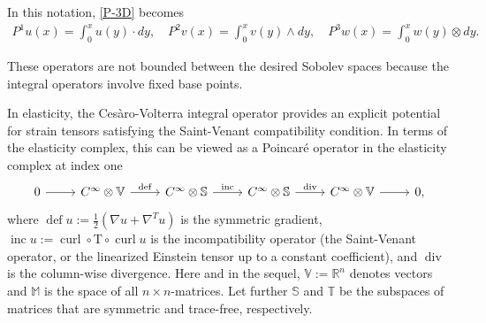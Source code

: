 \documentclass[11pt]{amsart}
\newcommand{\0}{\mathaccent23}
\newcommand\inc{\operatorname{inc}}
\newcommand\deff{\operatorname{def}}
\renewcommand\div{\operatorname{div}}
\newcommand\curl{\operatorname{curl}}
\begin{document}
In this notation, \eqref{P-3D} becomes
\begin{align}\label{P-3D-new-notation}
P^{1}u(x)=\int_{0}^{x}u(y)\cdot dy, \quad P^{2}v(x)=\int_{0}^{x}v(y)\wedge dy, \quad P^{3}w(x)=\int_{0}^{x}w(y)\otimes dy.
\end{align}



 These operators are not bounded between the desired Sobolev spaces because the integral operators involve fixed base points.  

In elasticity, the Ces\`aro-Volterra integral operator provides an explicit potential for strain tensors satisfying the Saint-Venant compatibility condition. In terms of the elasticity complex, this can be viewed as a Poincar\'e operator in the elasticity complex at index one
\begin{equation}\label{elasticity-smooth}
\begin{tikzcd}
0\arrow{r}& C^{\infty}\otimes \mathbb{V}\arrow{r}{\deff} &  C^{\infty}\otimes \mathbb{S} \arrow{r}{\inc} & C^{\infty}\otimes \mathbb{S} \arrow{r}{\div} &C^{\infty}\otimes \mathbb{V}\arrow{r} & 0,  
\end{tikzcd}
\end{equation}
where $\deff u:=\frac{1}{2}(\nabla u+\nabla^{T}u)$ is the symmetric gradient, $\inc u:=\curl\circ \mathrm{T}\circ \curl u$ is the incompatibility operator (the Saint-Venant operator, or the linearized Einstein tensor up to a constant coefficient), and $\div$ is the column-wise divergence.  Here and in the sequel, $\mathbb V:=\mathbb R^n$ denotes vectors and $\mathbb M$ is the space of all $n\times n$-matrices. Let further $\mathbb S$ and $\mathbb T$ be the subspaces of matrices that are symmetric and trace-free, respectively.
\end{document}
